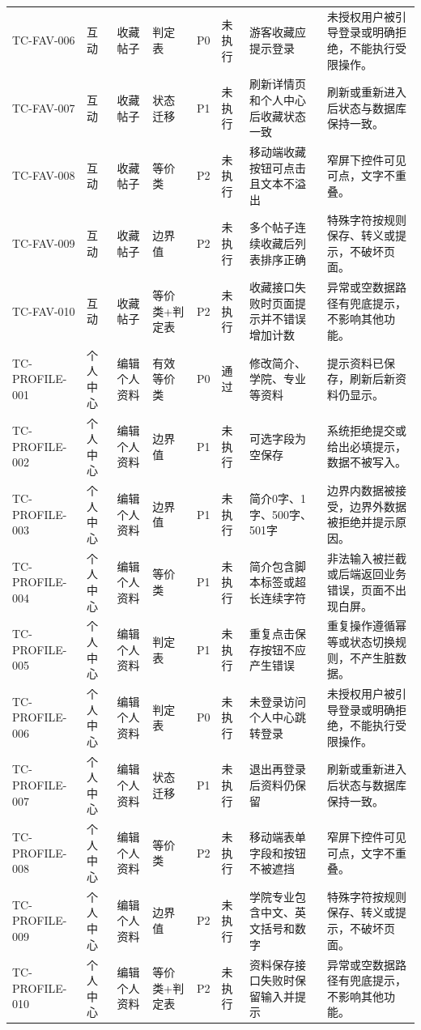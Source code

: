 \documentclass[UTF8,zihao=-4]{ctexart}
\begin{document}
{\begin{longtable}{P{1.8cm}P{1.7cm}P{2.2cm}P{1.8cm}P{1cm}P{1.2cm}P{4.1cm}P{5.3cm}}
TC-FAV-006 & 互动 & 收藏帖子 & 判定表 & P0 & 未执行 & 游客收藏应提示登录 & 未授权用户被引导登录或明确拒绝，不能执行受限操作。 \\
TC-FAV-007 & 互动 & 收藏帖子 & 状态迁移 & P1 & 未执行 & 刷新详情页和个人中心后收藏状态一致 & 刷新或重新进入后状态与数据库保持一致。 \\
TC-FAV-008 & 互动 & 收藏帖子 & 等价类 & P2 & 未执行 & 移动端收藏按钮可点击且文本不溢出 & 窄屏下控件可见可点，文字不重叠。 \\
TC-FAV-009 & 互动 & 收藏帖子 & 边界值 & P2 & 未执行 & 多个帖子连续收藏后列表排序正确 & 特殊字符按规则保存、转义或提示，不破坏页面。 \\
TC-FAV-010 & 互动 & 收藏帖子 & 等价类+判定表 & P2 & 未执行 & 收藏接口失败时页面提示并不错误增加计数 & 异常或空数据路径有兜底提示，不影响其他功能。 \\
TC-PROFILE-001 & 个人中心 & 编辑个人资料 & 有效等价类 & P0 & 通过 & 修改简介、学院、专业等资料 & 提示资料已保存，刷新后新资料仍显示。 \\
TC-PROFILE-002 & 个人中心 & 编辑个人资料 & 边界值 & P1 & 未执行 & 可选字段为空保存 & 系统拒绝提交或给出必填提示，数据不被写入。 \\
TC-PROFILE-003 & 个人中心 & 编辑个人资料 & 边界值 & P1 & 未执行 & 简介0字、1字、500字、501字 & 边界内数据被接受，边界外数据被拒绝并提示原因。 \\
TC-PROFILE-004 & 个人中心 & 编辑个人资料 & 等价类 & P1 & 未执行 & 简介包含脚本标签或超长连续字符 & 非法输入被拦截或后端返回业务错误，页面不出现白屏。 \\
TC-PROFILE-005 & 个人中心 & 编辑个人资料 & 判定表 & P1 & 未执行 & 重复点击保存按钮不应产生错误 & 重复操作遵循幂等或状态切换规则，不产生脏数据。 \\
TC-PROFILE-006 & 个人中心 & 编辑个人资料 & 判定表 & P0 & 未执行 & 未登录访问个人中心跳转登录 & 未授权用户被引导登录或明确拒绝，不能执行受限操作。 \\
TC-PROFILE-007 & 个人中心 & 编辑个人资料 & 状态迁移 & P1 & 未执行 & 退出再登录后资料仍保留 & 刷新或重新进入后状态与数据库保持一致。 \\
TC-PROFILE-008 & 个人中心 & 编辑个人资料 & 等价类 & P2 & 未执行 & 移动端表单字段和按钮不被遮挡 & 窄屏下控件可见可点，文字不重叠。 \\
TC-PROFILE-009 & 个人中心 & 编辑个人资料 & 边界值 & P2 & 未执行 & 学院专业包含中文、英文括号和数字 & 特殊字符按规则保存、转义或提示，不破坏页面。 \\
TC-PROFILE-010 & 个人中心 & 编辑个人资料 & 等价类+判定表 & P2 & 未执行 & 资料保存接口失败时保留输入并提示 & 异常或空数据路径有兜底提示，不影响其他功能。 \\

\end{longtable}}
\end{document}
